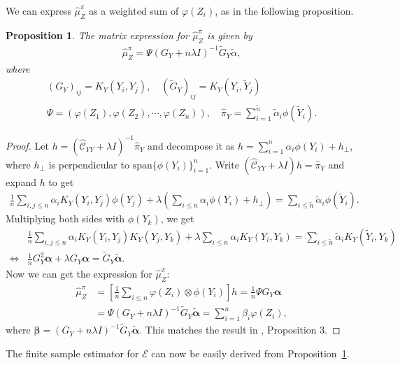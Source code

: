 \documentclass[a4paper]{article}
\renewcommand{\cal}{\mathcal}
\newcommand{\bs}{\boldsymbol}
\newtheorem{proposition}{Proposition}
\newcommand{\propref}[1]{Proposition~\ref{#1}}
\begin{document}
We can express $\widehat{\mu}_Z^\pi$ as a weighted sum of $\varphi(Z_i)$, as in the following proposition.
\begin{proposition}\label{prop:muz}
The matrix expression for $\widehat{\mu}_{Z}^\pi$ is given by
\begin{align}
\widehat{\mu}_Z^\pi = \Psi (G_Y + n \lambda I)^{-1} \tilde{G}_Y \tilde{\alpha},
\end{align}
where
\begin{gather}
(G_{Y})_{ij} = K_Y(Y_i,Y_j),\quad (\tilde{G}_{Y})_{ij} = K_Y(Y_i,\tilde{Y}_j)\\
\Psi = (\varphi(Z_1),\varphi(Z_2),\cdots,\varphi(Z_n)),\quad \widehat{\pi}_Y = \sum_{i=1}^{\tilde{n}}\tilde{\alpha}_i \phi(\tilde{Y}_i).
\end{gather}
\end{proposition}
\begin{proof}
Let $h = (\widehat{\cal{C}}_{YY}+\lambda I)^{-1}\widehat{\pi}_Y$ and decompose it as $h = \sum_{i=1}^n \alpha_i \phi(Y_i) + h_\perp$, where $h_\perp$ is perpendicular to $\mathrm{span}\{\phi(Y_i)\}_{i=1}^n$. Write $(\widehat{\cal{C}}_{YY}+\lambda I)h = \widehat{\pi}_Y$ and expand $h$ to get
\begin{align}
\frac{1}{n}\sum_{i,j\leq n} \alpha_i K_Y(Y_i,Y_j) \phi(Y_j) + \lambda(\sum_{i\leq n} \alpha_i \phi(Y_i) + h_\perp) = \sum_{i\leq \tilde{n}}\tilde{\alpha}_i \phi(\tilde{Y}_i).
\end{align}
Multiplying both sides with $\phi(Y_k)$, we get
\begin{align}
&\frac{1}{n}\sum_{i,j\leq n} \alpha_i K_Y(Y_i,Y_j) K_Y(Y_j,Y_k) + \lambda \sum_{i\leq n} \alpha_i K_Y(Y_i,Y_k) = \sum_{i\leq \tilde{n}}\tilde{\alpha}_i K_Y(\tilde{Y}_i,Y_k)\\
\Leftrightarrow& \frac{1}{n}G_Y^2 \bs{\alpha} + \lambda G_Y \bs{\alpha} = \tilde{G}_Y\bs{\tilde{\alpha}}.
\end{align}
Now we can get the expression for $\widehat{\mu}_Z^\pi$:
\begin{align}
\widehat{\mu}_Z^\pi &= \left[\frac{1}{n}\sum_{i\leq n}\varphi(Z_i)\otimes \phi(Y_i)\right] h = \frac{1}{n} \Psi G_Y \bs{\alpha}\\
&= \Psi (G_Y + n \lambda I)^{-1} \tilde{G}_Y \tilde{\bs{\alpha}} = \sum_{i=1}^n \beta_i \varphi(Z_i),
\end{align}
where $\bs{\beta} = (G_Y+n\lambda I)^{-1} \tilde{G}_Y \tilde{\bs{\alpha}}$. This matches the result in \cite{fukumizu2011kernel}, Proposition 3.
\end{proof}
The finite sample estimator for $\cal{E}$ can now be easily derived from \propref{prop:muz}.
\end{document}
